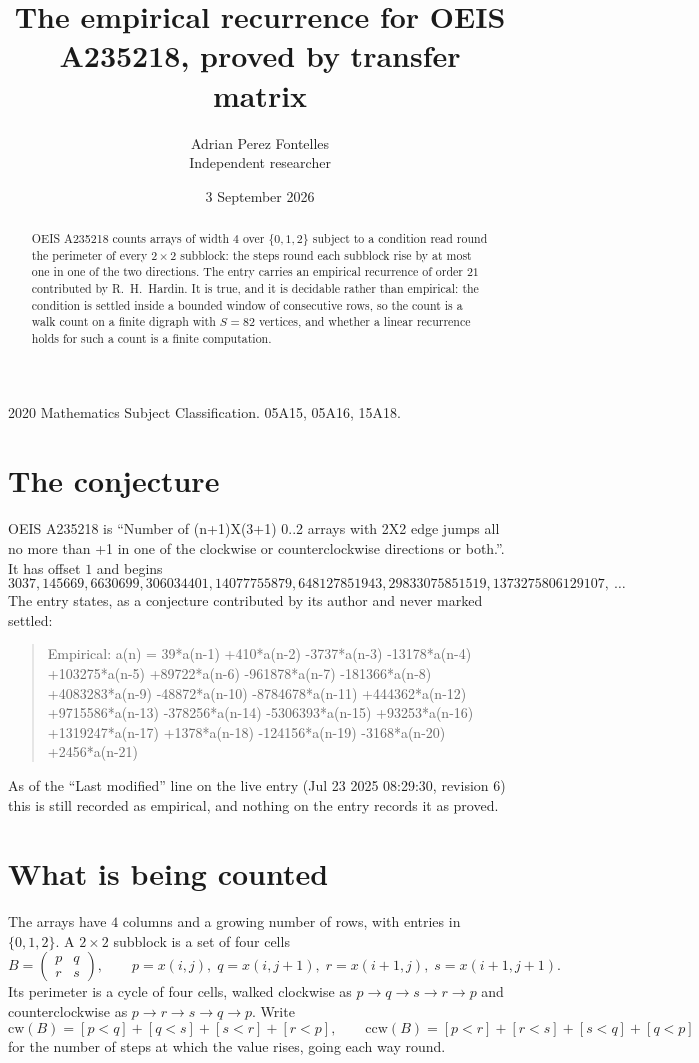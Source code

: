\documentclass[11pt,a4paper]{article}
\title{The empirical recurrence for OEIS A235218, proved by transfer matrix}
\author{Adrian Perez Fontelles\\ \small Independent researcher}
\date{3 September 2026}
\theoremstyle{plain}
\theoremstyle{definition}
\begin{document}
\maketitle

\begin{abstract}
OEIS A235218 counts arrays of width $4$ over $\{0,1,2\}$ subject to a condition read round the
perimeter of every $2\times2$ subblock: the steps round each subblock rise by at most one in one of the two directions. The entry carries an empirical recurrence of
order $21$ contributed by R.~H.~Hardin. It is true, and it is decidable rather than
empirical: the condition is settled inside a bounded window of consecutive rows, so the
count is a walk count on a finite digraph with $S=82$ vertices, and whether a linear
recurrence holds for such a count is a finite computation.
\end{abstract}

\noindent\small 2020 Mathematics Subject Classification. 05A15, 05A16, 15A18.\normalsize

\section{The conjecture}

OEIS A235218 is ``Number of (n+1)X(3+1) 0..2 arrays with 2X2 edge jumps all no more than +1 in one of the clockwise or counterclockwise directions or both.''. It has offset $1$ and begins
\[
3037, 145669, 6630699, 306034401, 14077755879, 648127851943, 29833075851519, 1373275806129107,\ \dots
\]
The entry states, as a conjecture contributed by its author and never marked settled:
\begin{quote}
Empirical: a(n) = 39*a(n-1) +410*a(n-2) -3737*a(n-3) -13178*a(n-4) +103275*a(n-5) +89722*a(n-6) -961878*a(n-7) -181366*a(n-8) +4083283*a(n-9) -48872*a(n-10) -8784678*a(n-11) +444362*a(n-12) +9715586*a(n-13) -378256*a(n-14) -5306393*a(n-15) +93253*a(n-16) +1319247*a(n-17) +1378*a(n-18) -124156*a(n-19) -3168*a(n-20) +2456*a(n-21)
\end{quote}
As of the ``Last modified'' line on the live entry (Jul 23 2025 08:29:30, revision 6) this is still
recorded as empirical, and nothing on the entry records it as proved.

\section{What is being counted}

The arrays have $4$ columns and a growing number of rows, with entries in $\{0,1,2\}$. A
$2\times2$ subblock is a set of four cells
\[
B=\begin{pmatrix} p & q \\ r & s \end{pmatrix},
\qquad p=x(i,j),\; q=x(i,j+1),\; r=x(i+1,j),\; s=x(i+1,j+1).
\]
Its perimeter is a cycle of four cells, walked clockwise as $p\to q\to s\to r\to p$ and
counterclockwise as $p\to r\to s\to q\to p$. Write
\[
\mathrm{cw}(B)=[p<q]+[q<s]+[s<r]+[r<p],\qquad
\mathrm{ccw}(B)=[p<r]+[r<s]+[s<q]+[q<p]
\]
for the number of steps at which the value rises, going each way round.
\end{document}
